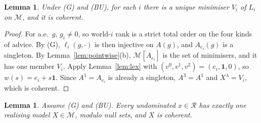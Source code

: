 \documentclass[11pt]{article}
\newtheorem{lemma}[theorem]{Lemma}
\theoremstyle{remark}
\newcommand{\one}{\mathbf 1}
\newcommand{\M}{\mathcal M}
\newcommand{\Rr}{\mathcal R}
\begin{document}
\begin{lemma}\label{lem:vertex}
Under \textup{(G)} and \textup{(BU)}, for each $i$ there is a unique minimiser $V_i$ of $L_i$ on $\M$, and it is coherent.
\end{lemma}

\begin{proof}
For a.e.\ $g$, $g_i\ne0$, so world-$i$ rank is a strict total order on the four kinds of advice. By (G), $\ell_i(g,\cdot)$ is then injective on $A(g)$, and $A_{e_i}(g)$ is a singleton. By Lemma~\ref{lem:pointwise}(b), $\M[A_{e_i}]$ is the set of minimisers, and it has one member $V_i$. Apply Lemma~\ref{lem:lex} with $(v^0,v^1,v^2)=(e_i,\one,0)$, so $w(s)=e_i+s\one$. Since $A^1=A_{e_i}$ is already a singleton, $A^3=A^1$ and $X^\lambda=V_i$, which is coherent.
\end{proof}

\begin{lemma}\label{lem:efficient}
Assume \textup{(G)} and \textup{(BU)}. Every undominated $x\in\Rr$ has exactly one realising model $X\in\M$, modulo null sets, and $X$ is coherent.
\end{lemma}
\end{document}
